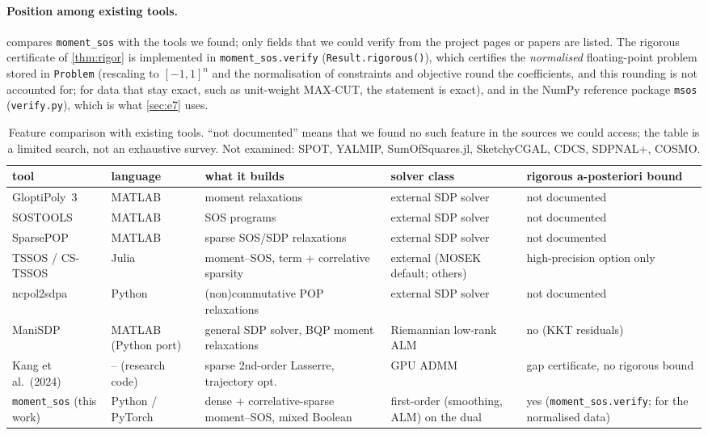 \documentclass[a4paper,11pt]{article}
\theoremstyle{plain}
\theoremstyle{definition}
\theoremstyle{remark}
\begin{document}
\paragraph{Position among existing tools.}  compares \texttt{moment\_sos} with the tools we found; only fields that we could verify from the project pages or papers are listed. The rigorous certificate of \cref{thm:rigor} is implemented in \texttt{moment\_sos.verify} (\texttt{Result.rigorous()}), which certifies the \emph{normalised} floating-point problem stored in \texttt{Problem} (rescaling to $[-1,1]^n$ and the normalisation of constraints and objective round the coefficients, and this rounding is not accounted for; for data that stay exact, such as unit-weight MAX-CUT, the statement is exact), and in the NumPy reference package \texttt{msos} (\texttt{verify.py}), which is what \cref{sec:e7} uses.
\begin{table}[t]\centering\scriptsize
\setlength{\tabcolsep}{3pt}\renewcommand{\arraystretch}{1.1}
\begin{tabular}{@{}p{2.1cm} p{1.6cm} p{3.4cm} p{3.1cm} p{3.6cm}@{}}\toprule
tool & language & what it builds & solver class & rigorous a-posteriori bound\\\midrule
GloptiPoly~3 & MATLAB & moment relaxations & external SDP solver & not documented\\
SOSTOOLS & MATLAB & SOS programs & external SDP solver & not documented\\
SparsePOP & MATLAB & sparse SOS/SDP relaxations & external SDP solver & not documented\\
TSSOS / CS-TSSOS & Julia & moment--SOS, term + correlative sparsity & external (MOSEK default; others) & high-precision option only\\
ncpol2sdpa & Python & (non)commutative POP relaxations & external SDP solver & not documented\\
ManiSDP & MATLAB (Python port) & general SDP solver, BQP moment relaxations & Riemannian low-rank ALM & no (KKT residuals)\\
Kang et al.\ (2024) & -- (research code) & sparse 2nd-order Lasserre, trajectory opt. & GPU ADMM & gap certificate, no rigorous bound\\
\texttt{moment\_sos} (this work) & Python / PyTorch & dense + correlative-sparse moment--SOS, mixed Boolean & first-order (smoothing, ALM) on the dual & yes (\texttt{moment\_sos.verify}; for the normalised data)\\
\bottomrule\end{tabular}
\caption{Feature comparison with existing tools. ``not documented'' means that we found no such feature in the sources we could access; the table is a limited search, not an exhaustive survey. Not examined: SPOT, YALMIP, SumOfSquares.jl, SketchyCGAL, CDCS, SDPNAL+, COSMO.}\label{tab:tools}
\end{table}
\end{document}

